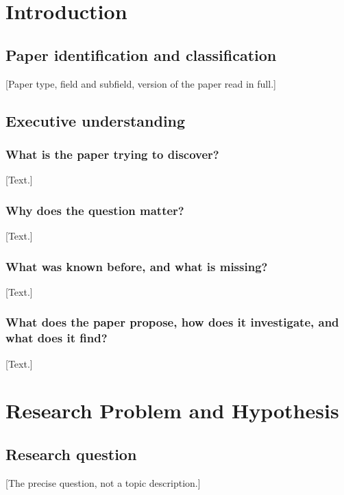 \documentclass{lrreview}
\begin{document}

\section{Introduction}

\subsection{Paper identification and classification}
[Paper type, field and subfield, version of the paper read in full.]

\subsection{Executive understanding}
\subsubsection{What is the paper trying to discover?}
[Text.]
\subsubsection{Why does the question matter?}
[Text.]
\subsubsection{What was known before, and what is missing?}
[Text.]
\subsubsection{What does the paper propose, how does it investigate, and what does it find?}
[Text.]

\section{Research Problem and Hypothesis}

\subsection{Research question}
 [The precise question, not a topic description.]
\end{document}

